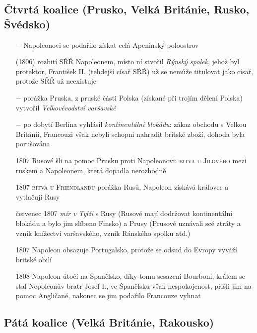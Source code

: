 \documentclass{article}
\begin{document}
\subsection*{Čtvrtá koalice (Prusko, Velká Británie, Rusko, Švédsko)}
\begin{itemize}
    \vspace{-0.5em}
    \setlength\itemsep{0.15em}
    \item[$-$] Napoleonovi se podařilo získat celá Apeninský poloostrov
    \item[(1806)] rozbití SŘŘ Napoleonem, místo ní stvořil \textit{Rýnský spolek}, jehož byl protektor, František II. (tehdejší císař SŘŘ) už se nemůže titulovat jako císař, protože SŘŘ už neexistuje
    \item[$-$] porážka Pruska, z pruské části Polska (získané při trojím dělení Polska) vytvořil \textit{Velkovévodství varšavské}
    \item[$-$] po dobytí Berlína vyhlásil \textit{kontinentální blokádu}: zákaz obchodu s Velkou Británií, Francouzi však nebyli schopni nahradit britské zboží, dohoda byla porušována
    \item[1807] Rusové šli na pomoc Prusku proti Napoleonovi: \textsc{bitva u Jílového} mezi ruskem a Napoleonem, která dopadla nerozhodně
    \item[1807] \textsc{bitva u Friendlandu} porážka Rusů, Napoleon získává královec a vytlačují Rusy
    \item[červenec 1807] \textit{mír v Tylži} s Rusy (Rusové mají dodržovat kontinentální blokádu a bylo jim slíbeno Finsko) a Prusy (Prusové uznávali scé ztráty a vznik knížectví varšavského, vznik Ránského spolku atd.)
    \item[1807] Napoleon obsazuje Portugalsko, protože se odsud do Evropy vyváží britské obilí
    \item[1808] Napoleon útočí na Španělsko, díky tomu sesazeni Bourboni, králem se stal Nepoleonův bratr Josef I., ve Španělsku však nespokojenost, přišli jim na pomoc Angličané, nakonec se jim podařilo Francouze vyhnat
\end{itemize}

\subsection*{Pátá koalice (Velká Británie, Rakousko)}
\end{document}
